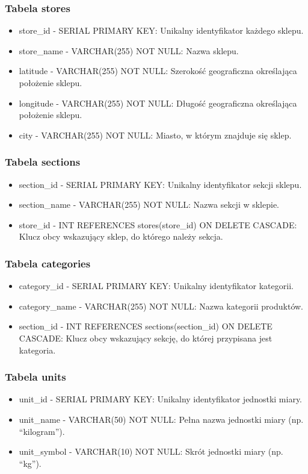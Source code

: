 \subsubsection{Tabela stores}
\begin{itemize}
\item store\_id - SERIAL PRIMARY KEY: Unikalny identyfikator każdego sklepu.
\item store\_name - VARCHAR(255) NOT NULL: Nazwa sklepu.
\item latitude - VARCHAR(255) NOT NULL: Szerokość geograficzna określająca położenie sklepu.
\item longitude - VARCHAR(255) NOT NULL: Długość geograficzna określająca położenie sklepu.
\item city - VARCHAR(255) NOT NULL: Miasto, w którym znajduje się sklep.
\end{itemize}

\subsubsection{Tabela sections}
\begin{itemize}
\item section\_id - SERIAL PRIMARY KEY: Unikalny identyfikator sekcji sklepu.
\item section\_name - VARCHAR(255) NOT NULL: Nazwa sekcji w sklepie.
\item store\_id - INT REFERENCES stores(store\_id) ON DELETE CASCADE: Klucz obcy wskazujący sklep, do którego należy sekcja.
\end{itemize}

\subsubsection{Tabela categories}
\begin{itemize}
\item category\_id - SERIAL PRIMARY KEY: Unikalny identyfikator kategorii.
\item category\_name - VARCHAR(255) NOT NULL: Nazwa kategorii produktów.
\item section\_id - INT REFERENCES sections(section\_id) ON DELETE CASCADE: Klucz obcy wskazujący sekcję, do której przypisana jest kategoria.
\end{itemize}

\subsubsection{Tabela units}
\begin{itemize}
\item unit\_id - SERIAL PRIMARY KEY: Unikalny identyfikator jednostki miary.
\item unit\_name - VARCHAR(50) NOT NULL: Pełna nazwa jednostki miary (np. “kilogram”).
\item unit\_symbol - VARCHAR(10) NOT NULL: Skrót jednostki miary (np. “kg”).
\end{itemize}

